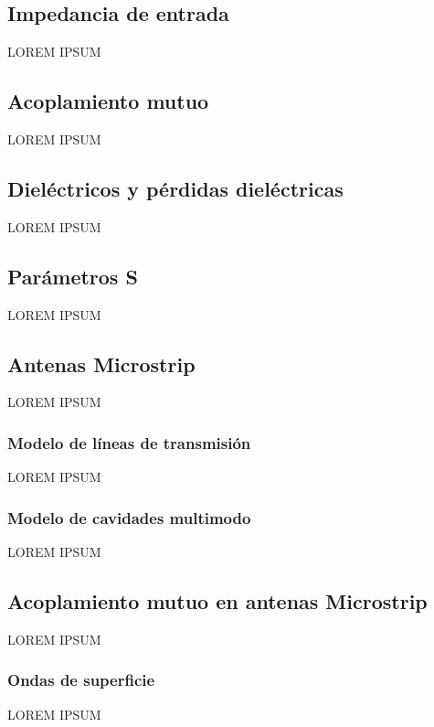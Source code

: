\subsection{Impedancia de entrada}
\label{subsec_imp_entrada}
LOREM IPSUM
\subsection{Acoplamiento mutuo}
\label{subsec_acoplamiento}
LOREM IPSUM
\subsection{Dieléctricos y pérdidas dieléctricas}
\label{subsec_dielectricos}
LOREM IPSUM
\subsection{Parámetros S}
\label{subsec_parametros_s}
LOREM IPSUM

\subsection{Antenas Microstrip}
\label{subsec_antenas_microstrip}
LOREM IPSUM
\subsubsection{Modelo de líneas de transmisión}
\label{subsubsec_microstrip_modeloLineas}
LOREM IPSUM
\subsubsection{Modelo de cavidades multimodo}
\label{subsubsec_microstrip_modeloCavidades}
LOREM IPSUM

\subsection{Acoplamiento mutuo en antenas Microstrip}
\label{subsec_acoplamiento_microstrip}
LOREM IPSUM
\subsubsection{Ondas de superficie}
\label{subsubsec_microstrip_ondas_superficie}
LOREM IPSUM

